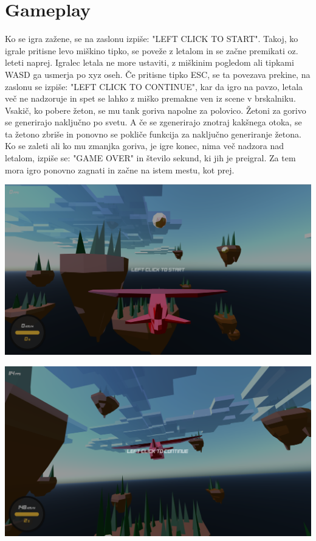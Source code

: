 \documentclass[a4paper]{article}
\begin{document}
\section{Gameplay}%
Ko se igra zažene, se na zaslonu izpiše: "LEFT CLICK TO START". Takoj, ko igrale pritisne levo miškino tipko, se poveže z letalom in se začne premikati oz. leteti naprej. Igralec letala ne more ustaviti, z miškinim pogledom ali tipkami WASD ga usmerja po xyz oseh. Če pritisne tipko ESC, se ta povezava prekine, na zaslonu se izpiše: "LEFT CLICK TO CONTINUE", kar da igro na pavzo, letala več ne nadzoruje in spet se lahko z miško premakne ven iz scene v brskalniku. Vsakič, ko pobere žeton, se mu tank goriva napolne za polovico. Žetoni za gorivo se generirajo naključno po svetu. A če se zgenerirajo znotraj kakšnega otoka, se ta žetono zbriše in ponovno se pokliče funkcija za naključno generiranje žetona. Ko se zaleti ali ko mu zmanjka goriva, je igre konec, nima več nadzora nad letalom, izpiše se: "GAME OVER" in število sekund, ki jih je preigral. Za tem mora igro ponovno zagnati in začne na istem mestu, kot prej.
\begin{center}
     \includegraphics[width=\columnwidth]{start.jpg}
\end{center}

\begin{center}
     \includegraphics[width=\columnwidth]{continue.jpg}
\end{center}
\end{document}
